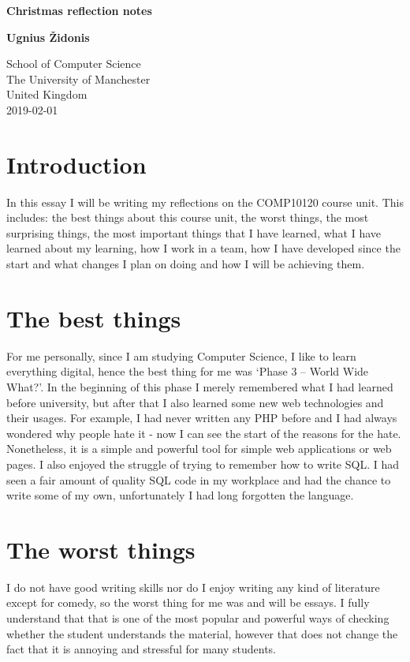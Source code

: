 \documentclass[a4paper]{article}
\begin{document}
\begin{titlepage}
	\begin{center}
	\vspace*{1cm}
 
	\Huge{\textbf{Christmas reflection notes}}
 
	\vspace{1.5cm}
 
	\textbf{Ugnius Židonis}
 
 	\vfill
	\vspace{0.8cm}
 
	School of Computer Science\\
	The University of Manchester\\
	United Kingdom\\
	2019-02-01
	\end{center}
\end{titlepage}

\section*{Introduction}
In this essay I will be writing my reflections on the COMP10120 course unit. This includes: the best things about this course unit, the worst things, the most surprising things, the most important things that I have learned, what I have learned about my learning, how I work in a team, how I have developed since the start and what changes I plan on doing and how I will be achieving them.
\section*{The best things}
For me personally, since I am studying Computer Science, I like to learn everything digital, hence the best thing for me was ‘Phase 3 – World Wide What?’. In the beginning of this phase I merely remembered what I had learned before university, but after that I also learned some new web technologies and their usages. For example, I had never written any PHP before and I had always wondered why people hate it - now I can see the start of the reasons for the hate. Nonetheless, it is a simple and powerful tool for simple web applications or web pages. I also enjoyed the struggle of trying to remember how to write SQL. I had seen a fair amount of quality SQL code in my workplace and had the chance to write some of my own, unfortunately I had long forgotten the language.
\section*{The worst things}
I do not have good writing skills nor do I enjoy writing any kind of literature except for comedy, so the worst thing for me was and will be essays. I fully understand that that is one of the most popular and powerful ways of checking whether the student understands the material, however that does not change the fact that it is annoying and stressful for many students.
\end{document}
